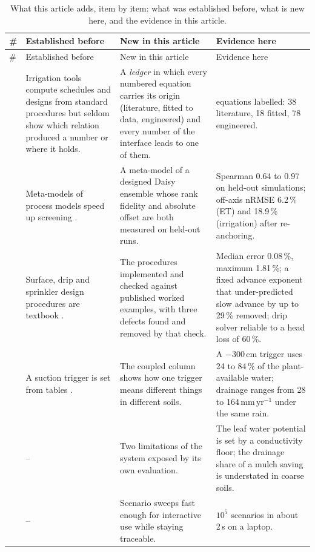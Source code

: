 {\small\setlength{\tabcolsep}{4pt}
\begin{longtable}{@{}>{\raggedright\arraybackslash}p{}>{\raggedright\arraybackslash}p{}>{\raggedright\arraybackslash}p{}>{\raggedright\arraybackslash}p{}@{}}
\caption{What this article adds, item by item: what was established before, what is new here, and the evidence in this article.}\label{tab:novelty}\\
\toprule
\# & Established before & New in this article & Evidence here\\\midrule\endfirsthead
\toprule \# & Established before & New in this article & Evidence here\\\midrule\endhead
1 & Irrigation tools compute schedules and designs from standard procedures \citep{Allen1998,Steduto2009,Simunek2016} but seldom show which relation produced a number or where it holds. & A \emph{ledger} in which every numbered equation carries its origin (literature, fitted to data, engineered) and every number of the interface leads to one of them. & 134 equations labelled: 38 literature, 18 fitted, 78 engineered.\\
2 & Meta-models of process models speed up screening \citep{Razavi2012,Asher2015}. & A meta-model of a designed Daisy ensemble whose rank fidelity and absolute offset are both measured on held-out runs. & Spearman 0.64 to 0.97 on held-out simulations; off-axis nRMSE 6.2\,\% (ET) and 18.9\,\% (irrigation) after re-anchoring.\\
3 & Surface, drip and sprinkler design procedures are textbook \citep{Walker1987,KellerKarmeli1974,Christiansen1942}. & The procedures implemented and checked against published worked examples, with three defects found and removed by that check. & Median error 0.08\,\%, maximum 1.81\,\%; a fixed advance exponent that under-predicted slow advance by up to 29\,\% removed; drip solver reliable to a head loss of 60\,\%.\\
4 & A suction trigger is set from tables \citep{Allen1998}. & The coupled column shows how one trigger means different things in different soils. & A $-300$\,cm trigger uses 24 to 84\,\% of the plant-available water; drainage ranges from 28 to 164\,mm\,yr$^{-1}$ under the same rain.\\
5 & -- & Two limitations of the system exposed by its own evaluation. & The leaf water potential is set by a conductivity floor; the drainage share of a mulch saving is understated in coarse soils.\\
6 & -- & Scenario sweeps fast enough for interactive use while staying traceable. & $10^5$ scenarios in about 2\,s on a laptop.\\
\bottomrule
\end{longtable}}
